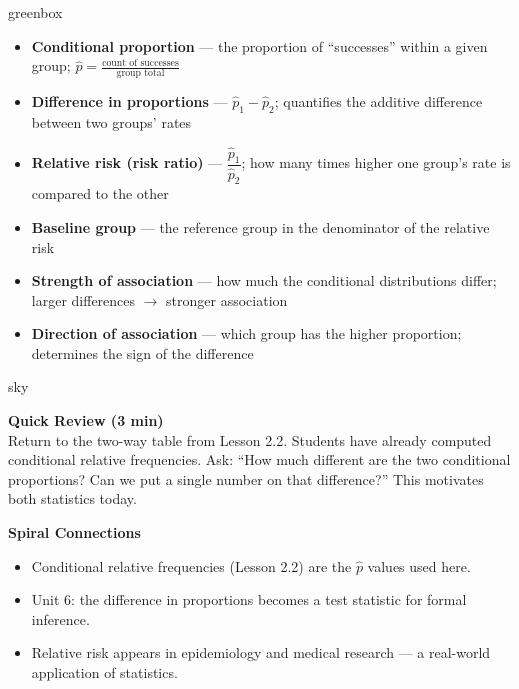 \documentclass[10pt]{article}
\begin{document}
\begin{skillbox}{greenbox}
\begin{minipage}[t]{0.48\linewidth}
    \begin{itemize}
        \item \textbf{Conditional proportion} --- the proportion of ``successes'' within a given group; $\hat{p} = \frac{\text{count of successes}}{\text{group total}}$
        \item \textbf{Difference in proportions} --- $\hat{p}_1 - \hat{p}_2$; quantifies the additive difference between two groups' rates
        \item \textbf{Relative risk (risk ratio)} --- $\dfrac{\hat{p}_1}{\hat{p}_2}$; how many times higher one group's rate is compared to the other
    \end{itemize}
\end{minipage}
\hfill
\begin{minipage}[t]{0.48\linewidth}
    \begin{itemize}
        \item \textbf{Baseline group} --- the reference group in the denominator of the relative risk
        \item \textbf{Strength of association} --- how much the conditional distributions differ; larger differences $\to$ stronger association
        \item \textbf{Direction of association} --- which group has the higher proportion; determines the sign of the difference
    \end{itemize}
\end{minipage}
\end{skillbox}

\begin{skillbox}{sky}
\begin{minipage}[t]{0.48\linewidth}
    \textbf{Quick Review (3 min)}\\
    Return to the two-way table from Lesson 2.2. Students have already computed conditional relative frequencies. Ask: ``How much different are the two conditional proportions? Can we put a single number on that difference?'' This motivates both statistics today.
\end{minipage}
\hfill
\begin{minipage}[t]{0.48\linewidth}
    \textbf{Spiral Connections}
    \begin{itemize}
        \item Conditional relative frequencies (Lesson 2.2) are the $\hat{p}$ values used here.
        \item Unit 6: the difference in proportions becomes a test statistic for formal inference.
        \item Relative risk appears in epidemiology and medical research --- a real-world application of statistics.
    \end{itemize}
\end{minipage}
\end{skillbox}
\end{document}
